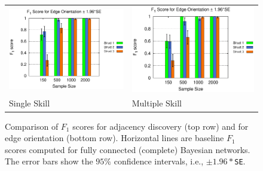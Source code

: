 \documentclass{edm_template}
\begin{document}
\begin{figure}[!ht]
\begin{center}
\begin{tabular}{>{\centering}m{1.5in} >{\centering\arraybackslash}m{1.5in}}
				\includegraphics[width=1.1\linewidth]{figures/F1O_single.eps} &\includegraphics[width=1.1\linewidth]{figures/F1O_multi.eps}\\
				Single Skill& Multiple Skill
			\end{tabular}
		\end{center}
		\vspace{-1em}
		\caption{Comparison of $F_1$ scores for adjacency discovery (top row) and for edge orientation (bottom row). 
			Horizontal lines are baseline $F_1$ scores computed for fully connected (complete) Bayesian networks.
			The error bars show the $95\%$ confidence intervals, i.e., $\pm 1.96*$\texttt{SE}.} 
		\label{fig:f1-single-multi}
	\end{figure} 
\end{document}
